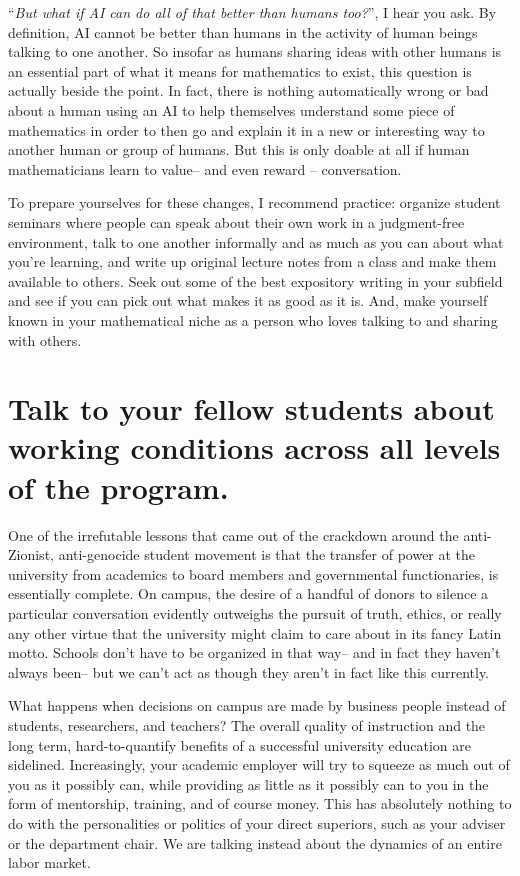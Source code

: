 \documentclass[11pt,reqno]{amsart}
\theoremstyle{plain}
\theoremstyle{definition}
\numberwithin{equation}{section}
\numberwithin{theorem}{section}
\begin{document}
``\textit{But what if AI can do all of that better than humans too?}'', I hear you ask. By definition, AI cannot be better than humans in the activity of human beings talking to one another. So insofar as humans sharing ideas with other humans is an essential part of what it means for mathematics to exist, this question is actually beside the point. In fact, there is nothing automatically wrong or bad about a human using an AI to help themselves understand some piece of mathematics in order to then go and explain it in a new or interesting way to another human or group of humans. But this is only doable at all if human mathematicians learn to value– and even reward – conversation.

To prepare yourselves for these changes, I recommend practice: organize student seminars where people can speak about their own work in a judgment-free environment, talk to one another informally and as much as you can about what you’re learning, and write up original lecture notes from a class and make them available to others. Seek out some of the best expository writing in your subfield and see if you can pick out what makes it as good as it is. And, make yourself known in your mathematical niche as a person who loves talking to and sharing with others. 


\section{Talk to your fellow students about working conditions across all levels of the program.  
}


One of the irrefutable lessons that came out of the crackdown around the anti-Zionist, anti-genocide student movement is that the transfer of power at the university from academics to board members and governmental functionaries, is essentially complete. On campus, the desire of a handful of donors to silence a particular conversation evidently outweighs the pursuit of truth, ethics, or really any other virtue that the university might claim to care about in its fancy Latin motto. Schools don’t have to be organized in that way– and in fact they haven’t always been– but we can’t act as though they aren’t in fact like this currently. 


What happens when decisions on campus are made by business people instead of students, researchers, and teachers? The overall quality of instruction and the long term, hard-to-quantify benefits of a successful university education are sidelined. Increasingly, your academic employer will try to squeeze as much out of you as it possibly can, while providing as little as it possibly can to you in the form of mentorship, training, and of course money. This has absolutely nothing to do with the personalities or politics of your direct superiors, such as your adviser or the department chair. We are talking instead about the dynamics of an entire labor market. 
\end{document}
